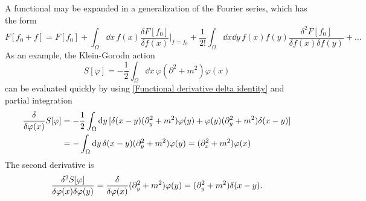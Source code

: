 A functional may be expanded in a generalization of the Fourier series, which has the form
\begin{equation}
    F[f_0 + f] = F[f_0] + \int_\Omega \dd x \, f(x) \frac{\delta F[f_0]}{\delta f(x)}\bigg|_{f = f_0}
    + \frac{1}{2!}\int_\Omega \dd x \dd y \, f(x) f(y) \frac{\delta^2 F [f_0]}{\delta f(x) \delta f(y)}
    + \dots
\end{equation}
As an example, the Klein-Gorodn action
\begin{equation}
    S[\varphi] = - \frac{1}{2}\int_\Omega \dd x \, \varphi (\partial^2 + m^2) \varphi(x)
\end{equation}
can be evaluated quickly by using \autoref{Functional derivative delta identity} and partial integration
\begin{align}
    \nonumber
    \frac{\delta }{\delta \varphi(x)} S[\varphi] 
    & = 
    - \frac{1}{2} \int_\Omega \dd y \, 
    [\delta(x - y)(\partial_y^2 + m^2)\varphi(y) + \varphi(y) (\partial_y^2 + m^2)\delta(x - y)] \\
    & = 
    - \int_\Omega \dd y \, 
    \delta(x - y)(\partial_y^2 + m^2)\varphi(y) 
    = (\partial_x^2 + m^2)\varphi(x)
\end{align}
The second derivative is
\begin{equation}
    \frac{\delta^2S[\varphi]}{\delta \varphi(x)\delta \varphi(y)}
    =
    \frac{\delta }{\delta \varphi(x)} (\partial_y^2 + m^2)\varphi(y)
    = 
    (\partial_y^2 + m^2) \delta(x - y).
\end{equation}



